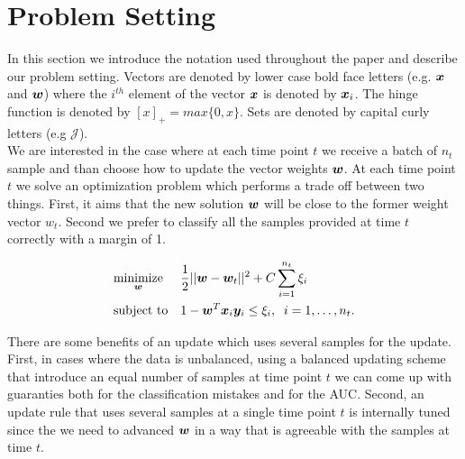 \section{Problem Setting}

In this section we introduce the notation used throughout the paper and describe our problem setting. Vectors are denoted by lower case bold face letters (e.g. $\bm{x}$ and $\bm{w}$) where the $i^{th}$ element of the vector $\bm{x}$ is denoted by $\bm{x}_i$. The hinge function is denoted by $[x]_+ = max\{0, x\} $. Sets are denoted by capital curly letters (e.g $\mathcal{J}$).\\

We are interested in the case where at each time point $t$ we receive a batch of $n_t$ sample and than choose how to update the vector weights $\bm{w}$. At each time point $t$ we solve an optimization problem which performs a trade off between two things. First, it aims that the new solution $\bm{w}$ will be close to the former weight vector $w_t$. Second we prefer to classify all the samples provided at time $t$ correctly with a margin of 1.

\begin{equation*}
\begin{aligned}
& \underset{\bm{w}}{\text{minimize}}
& & \frac{1}{2} || \bm{w} - \bm{w}_t ||^2 + C \sum\limits_{i=1}^{n_t}{\xi_i} \\
& \text{subject to}
& & 1 - \bm{w}^T \bm{x}_i \bm{y}_i \leq \xi_i, \;
 \; i = 1, \ldots, n_t.
\end{aligned}
\end{equation*}

There are some benefits of an update which uses several samples for the update. First, in cases where the data is unbalanced, using a balanced updating scheme that introduce an equal number of samples at time point $t$ we can come up with guaranties both for the classification mistakes and for the AUC.
Second, an update rule that uses several samples at a single time point $t$ is internally tuned since the we need to advanced $\bm{w}$ in a way that is agreeable with the samples at time $t$.